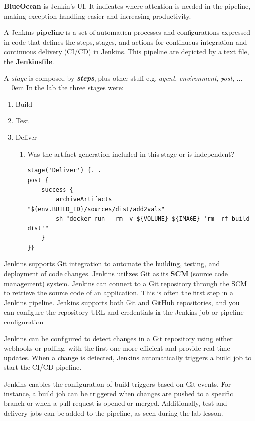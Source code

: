 \textbf{BlueOcean} is Jenkin's UI. It indicates where attention is needed in the pipeline, making exception handling easier and increasing productivity.

A Jenkins \textbf{pipeline} is a set of automation processes and configurations expressed in code that defines the steps, stages, and actions for continuous integration and continuous delivery (CI/CD) in Jenkins. This pipeline are depicted by a text file, the \textbf{Jenkinsfile}.\\
{
\footnotesize\color{gray}
A \textit{stage} is composed by \textbf{\textit{steps}}, plus other stuff e.g. \textit{agent}, \textit{environment}, \textit{post}, ...\\
\parskip = 0em
In the lab the three stages were:
\begin{enumerate}[parsep=0em,itemsep=0em,topsep=0em]
   \item Build
   \item Test
   \item Deliver
         \begin{enumerate}[parsep=0em,noitemsep,topsep=0em]
            \item Was the artifact generation included in this stage or is independent?
                  \begin{verbatim}
stage('Deliver') {...
post {
    success {
        archiveArtifacts "${env.BUILD_ID}/sources/dist/add2vals"
        sh "docker run --rm -v ${VOLUME} ${IMAGE} 'rm -rf build dist'"
    }
}}
\end{verbatim}
         \end{enumerate}
\end{enumerate}
}

Jenkins supports Git integration to automate the building, testing, and deployment of code changes. Jenkins utilizes Git as its \textbf{SCM} (source code management) system. Jenkins can connect to a Git repository through the SCM to retrieve the source code of an application. This is often the first step in a Jenkins pipeline. Jenkins supports both Git and GitHub repositories, and you can configure the repository URL and credentials in the Jenkins job or pipeline configuration.

Jenkins can be configured to detect changes in a Git repository using either webhooks or polling, with the first one more efficient and provide real-time updates. When a change is detected, Jenkins automatically triggers a build job to start the CI/CD pipeline.

Jenkins enables the configuration of build triggers based on Git events. For instance, a build job can be triggered when changes are pushed to a specific branch or when a pull request is opened or merged. Additionally, test and delivery jobs can be added to the pipeline, as seen during the lab lesson.
